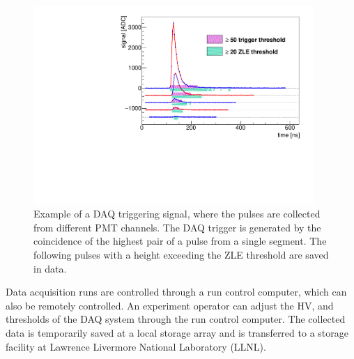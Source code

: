 \begin{figure}[h!]
\centering
\includegraphics[width=0.95\textwidth]{Figures/Triggering.pdf}\quad
\caption[DAQ triggering signal]{
Example of a DAQ triggering signal, where the pulses are collected from different PMT channels.
The DAQ trigger is generated by the coincidence of the highest pair of a pulse from a single segment.
The following pulses with a height exceeding the ZLE threshold are saved in data.}
\label{fig:trigger}
\end{figure}

Data acquisition runs are controlled through a run control computer, which can also be remotely controlled. 
An experiment operator can adjust the HV, and thresholds of the DAQ system through the run control computer. 
The collected data is temporarily saved at a local storage array and is transferred to a storage facility at Lawrence Livermore National Laboratory (LLNL).

